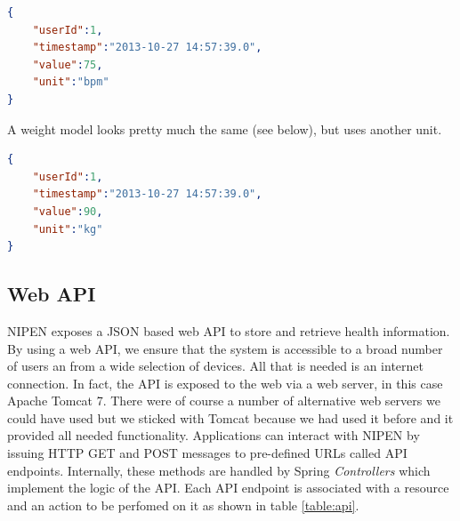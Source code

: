 \begin{lstlisting}[language=json]
{
	"userId":1,
	"timestamp":"2013-10-27 14:57:39.0",
	"value":75,
	"unit":"bpm"
}
\end{lstlisting}

A weight model looks pretty much the same (see below), but uses another unit.

\begin{lstlisting}[language=json]
{
	"userId":1,
	"timestamp":"2013-10-27 14:57:39.0",
	"value":90,
	"unit":"kg"
}
\end{lstlisting} 

\subsection{Web API}
\label{subsec:api}

NIPEN exposes a JSON based web API to store and retrieve health information.
By using a web API, we ensure that the system is accessible to a broad number of users
an from a wide selection of devices. All that is needed is an internet connection.
In fact, the API is exposed to the web via a web server, in this case Apache Tomcat 7.
There were of course a number of alternative web servers we could have used but we sticked
with Tomcat because we had used it before and it provided all needed functionality.
Applications can interact with NIPEN by issuing HTTP GET and POST messages to pre-defined URLs called API endpoints.
Internally, these methods are handled by Spring \textit{Controllers} which implement the logic of the API.
Each API endpoint is associated with a resource and an action to be perfomed on it as shown in table \ref{table:api}.

